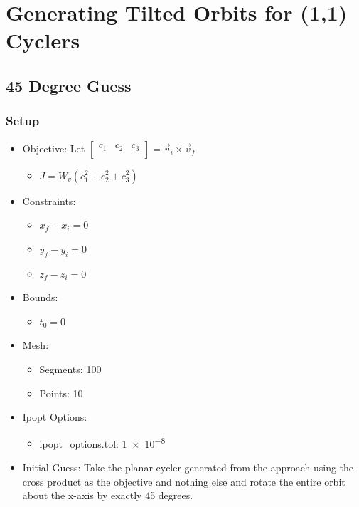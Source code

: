 \documentclass{article}
\begin{document}
\section{Generating Tilted Orbits for (1,1) Cyclers}

\subsection{45 Degree Guess}

\subsubsection{Setup}

\begin{itemize}
    \item Objective: Let $\left[\begin{matrix}c_1&c_2&c_3\\\end{matrix}\right] = \vec{v}_i\times\vec{v}_f$
    \begin{itemize}
        \item $J = W_v\left(c_1^2 + c_2^2 + c_3^2\right)$
    \end{itemize}
    \item Constraints: 
    \begin{itemize}
        \item $x_f - x_i = 0$
        \item $y_f - y_i = 0$
        \item $z_f - z_i = 0$
    \end{itemize}
    \item Bounds:
    \begin{itemize}
        \item $t_0 = 0$
    \end{itemize}
    \item Mesh:
    \begin{itemize}
        \item Segments: 100
        \item Points: 10
    \end{itemize}
    \item Ipopt Options:
    \begin{itemize}
        \item ipopt\_options.tol: \num{1e-8}
    \end{itemize}
    \item Initial Guess: Take the planar cycler generated from the approach using the cross product as the objective and nothing else and rotate the entire orbit about the x-axis by exactly 45 degrees.
\end{itemize}
\end{document}
